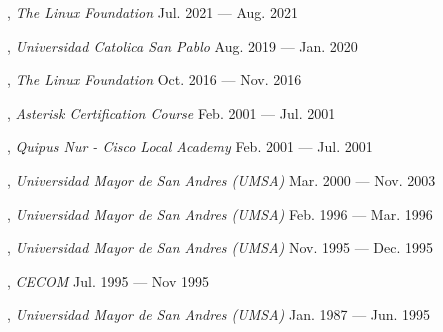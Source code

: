 
, \textit{The Linux Foundation}	\hfill Jul. 2021 --- Aug. 2021

, \textit{Universidad Catolica San Pablo}	\hfill Aug. 2019 --- Jan. 2020

, \textit{The Linux Foundation}	\hfill Oct. 2016 --- Nov. 2016

, \textit{Asterisk Certification Course}	\hfill Feb. 2001 --- Jul. 2001

, \textit{Quipus Nur - Cisco Local Academy}	\hfill Feb. 2001 --- Jul. 2001

, \textit{Universidad Mayor de San Andres (UMSA)}	\hfill Mar. 2000 --- Nov. 2003

, \textit{Universidad Mayor de San Andres (UMSA)}	\hfill Feb. 1996 --- Mar. 1996

, \textit{Universidad Mayor de San Andres (UMSA)}	\hfill Nov. 1995 --- Dec. 1995

, \textit{CECOM} \hfill	Jul. 1995 --- Nov 1995

, \textit{Universidad Mayor de San Andres (UMSA)}	\hfill Jan. 1987 --- Jun. 1995



